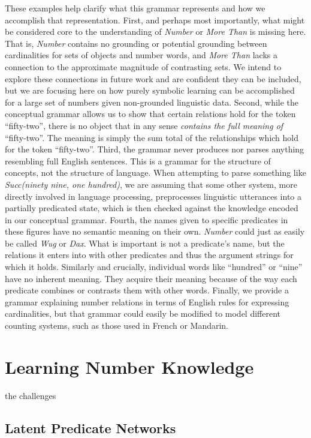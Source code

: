 \documentclass[10pt,letterpaper]{article}
\begin{document}
These examples help clarify what this grammar represents and how we
accomplish that representation. First, and perhaps most importantly,
what might be considered core to the understanding of \emph{Number} or
\emph{More Than} is missing here. That is, \emph{Number} contains no
grounding or potential grounding between cardinalities for sets of
objects and number words, and \emph{More Than} lacks a connection to
the approximate magnitude of contrasting sets. We intend to explore
these connections in future work and are confident they can be
included, but we are focusing here on how purely symbolic learning can
be accomplished for a large set of numbers given non-grounded
linguistic data. Second, while the conceptual grammar allows us to
show that certain relations hold for the token ``fifty-two'', there is
no object that in any sense \emph{contains the full meaning of}
``fifty-two''. The meaning is simply the sum total of the
relationships which hold for the token ``fifty-two''. Third, the
grammar never produces nor parses anything resembling full English
sentences. This is a grammar for the structure of concepts, not the
structure of language. When attempting to parse something like
\emph{Succ(ninety nine, one hundred)}, we are assuming that some other
system, more directly involved in language processing, preprocesses
linguistic utterances into a partially predicated state, which is then
checked against the knowledge encoded in our conceptual
grammar. Fourth, the names given to specific predicates in these
figures have no semantic meaning on their own. \emph{Number} could
just as easily be called \emph{Wug} or \emph{Dax}. What is important
is not a predicate's name, but the relations it enters into with other
predicates and thus the argument strings for which it holds. Similarly
and crucially, individual words like ``hundred'' or ``nine'' have no
inherent meaning. They acquire their meaning because of the way each
predicate combines or contrasts them with other words. Finally, we
provide a grammar explaining number relations in terms of English
rules for expressing cardinalities, but that grammar could easily be
modified to model different counting systems, such as those used in
French or Mandarin.

\section{Learning Number Knowledge}

the challenges

\subsection{Latent Predicate Networks}
\end{document}
